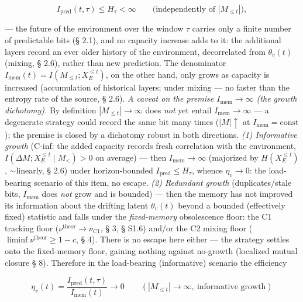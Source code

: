 \documentclass[12pt]{iopart}
\begin{document}
\begin{equation}I_{\text{pred}}(t,\tau) \le H_\tau < \infty \qquad\text{(independently of }|M_{\le t}|\text{)}, \tag{5.3}\end{equation}



--- the future of the environment over the window \(\tau\) carries only a finite number of predictable bits (§ 2.1), and no capacity increase adds to it: the additional layers record an ever older history of the environment, decorrelated from \(\theta_v(t)\) (mixing, § 2.6), rather than new prediction. The denominator \(I_{\text{mem}}(t) = I(M_{\le t}; X_E^{\le t})\), on the other hand, only grows as capacity is increased (accumulation of historical layers; under mixing --- no faster than the entropy rate of the source, § 2.6). \emph{A caveat on the premise \(I_{\text{mem}}\to\infty\) (the growth dichotomy).} By definition \(|M_{\le t}|\to\infty\) does \emph{not} yet entail \(I_{\text{mem}}\to\infty\) --- a degenerate strategy could record the same bit many times (\(|M|\uparrow\) at \(I_{\text{mem}} = \text{const}\)); the premise is closed by a dichotomy robust in both directions. \emph{(1) Informative growth} (C-inf: the added capacity records fresh correlation with the environment, \(I(\Delta M; X_E^{\le t}\mid M_{<}) > 0\) on average) --- then \(I_{\text{mem}}\to\infty\) (majorized by \(H(X_E^{\le t})\), \(\sim\)linearly, § 2.6) under horizon-bounded \(I_{\text{pred}} \le H_\tau\), whence \(\eta_v\to0\): the load-bearing scenario of this item, no escape. \emph{(2) Redundant growth} (duplicates/stale bits, \(I_{\text{mem}}\) does \emph{not} grow and is bounded) --- then the memory has not improved its information about the drifting latent \(\theta_v(t)\) beyond a bounded (effectively fixed) statistic and falls under the \emph{fixed-memory} obsolescence floor: the C1 tracking floor (\(\nu^{\text{theor}}\to\nu_{C1}\), § 3, § S1.6) and/or the C2 mixing floor (\(\liminf\nu^{\text{theor}}\ge1-c\), § 4). There is no escape here either --- the strategy settles onto the fixed-memory floor, gaining nothing against no-growth (localized mutual closure § 8). Therefore in the load-bearing (informative) scenario the efficiency



\[\eta_v(t) = \frac{I_{\text{pred}}(t,\tau)}{I_{\text{mem}}(t)} \to 0 \qquad (|M_{\le t}| \to \infty,\ \text{informative growth})\]
\end{document}
